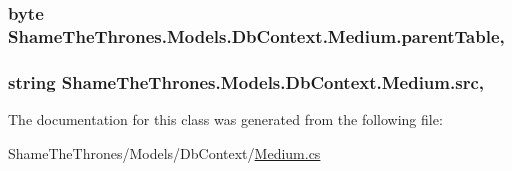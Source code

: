\subsubsection[{\texorpdfstring{parent\+Table}{parentTable}}]{\setlength{\rightskip}{0pt plus 5cm}byte Shame\+The\+Thrones.\+Models.\+Db\+Context.\+Medium.\+parent\+Table\hspace{0.3cm}{\ttfamily [get]}, {\ttfamily [set]}}\hypertarget{class_shame_the_thrones_1_1_models_1_1_db_context_1_1_medium_ab4933d3b0b877c99da6bff35d38a5b4c}{}\label{class_shame_the_thrones_1_1_models_1_1_db_context_1_1_medium_ab4933d3b0b877c99da6bff35d38a5b4c}
\subsubsection[{\texorpdfstring{src}{src}}]{\setlength{\rightskip}{0pt plus 5cm}string Shame\+The\+Thrones.\+Models.\+Db\+Context.\+Medium.\+src\hspace{0.3cm}{\ttfamily [get]}, {\ttfamily [set]}}\hypertarget{class_shame_the_thrones_1_1_models_1_1_db_context_1_1_medium_a20efed3dc82d9ca239f7fdfcb98995fe}{}\label{class_shame_the_thrones_1_1_models_1_1_db_context_1_1_medium_a20efed3dc82d9ca239f7fdfcb98995fe}


The documentation for this class was generated from the following file\+:\begin{DoxyCompactItemize}
\item 
Shame\+The\+Thrones/\+Models/\+Db\+Context/\hyperlink{_medium_8cs}{Medium.\+cs}\end{DoxyCompactItemize}
